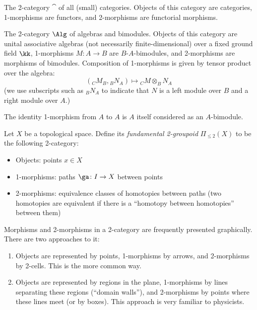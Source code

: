 \begin{example}\label{x:cat}
  The 2-category $\cat$ of all (small) categories. Objects of this category are
  categories, 1-morphisms are functors, and 2-morphisms are functorial
  morphisms.
\end{example}
\begin{example} \label{x:alg}
  The 2-category $\Alg$ of algebras and bimodules. Objects of this category are
  unital associative algebras (not necessarily finite-dimensional) over a fixed
  ground field $\kk$, 1-morphisms $M\colon A\to B$ are $B$-$A$-bimodules,
  and 2-morphisms are morphisms of bimodules. Composition of 1-morphisms
  is given by tensor product over the algebra:
  $$
  ({}_CM_B, {}_BN_A)\mapsto {}_C M\otimes_B N_A
  $$
  (we use subscripts such as ${}_BN_A$ to indicate that $N$ is a left module
  over $B$ and a right module over $A$.)

  The identity 1-morphism from $A$ to $A$ is $A$ itself considered as an
  $A$-bimodule.
\end{example}
\begin{example} \label{x:2groupoid}
  Let $X$ be a topological space. Define its \emph{fundamental
  2-groupoid} $\Pi_{\leq 2}(X)$ to be the
  following 2-category:
  \begin{itemize}
    \item Objects: points $x\in X$
    \item 1-morphisms: paths $\ga\colon I \to X$ between points
    \item 2-morphisms: equivalence classes of homotopies between paths
          (two homotopies are equivalent if there is a ``homotopy between
          homotopies'' between them)
  \end{itemize}
\end{example}

Morphisms and 2-morphisms in a 2-category are frequently presented graphically.
There are two approaches to it:
\begin{enumerate}
  \item Objects are represented by points, 1-morphisms by arrows,
    and 2-morphisms by 2-cells. This is the more common way.

  \item Objects are represented by regions in the plane, 1-morphisms by lines
    separating these regions (``domain walls''),
    and 2-morphisms by points where these lines meet (or by boxes).
    This approach is very familiar to physicists.
\end{enumerate}

